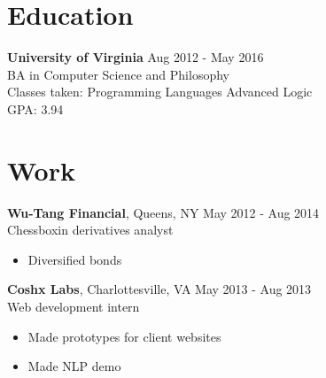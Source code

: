 \documentclass[margin]{res}
\begin{document}
 
 
 
\address{175 Scott Lane \\ Louisa, VA 23093 \\  \\ www.github.com/rolph-recto \\ (540) 748-3260}

 
\begin{resume} 

\section{Education}

  {\bf University of Virginia} \hfill Aug 2012 - May 2016 \\
  BA in Computer Science and Philosophy \\
  Classes taken:  Programming Languages  Advanced Logic  \\
  GPA: 3.94 \\

 

\section{Work}

  {\bf Wu-Tang Financial}, Queens, NY \hfill May 2012 - Aug 2014 \\ Chessboxin derivatives analyst

  \begin{itemize} \itemsep -2pt  %
  
    \item Diversified bonds
  
  \end{itemize}

  {\bf Coshx Labs}, Charlottesville, VA \hfill May 2013 - Aug 2013 \\ Web development intern

  \begin{itemize} \itemsep -2pt  %
  
    \item Made prototypes for client websites
  
    \item Made NLP demo
  
  \end{itemize}


\end{resume}
\end{document}
